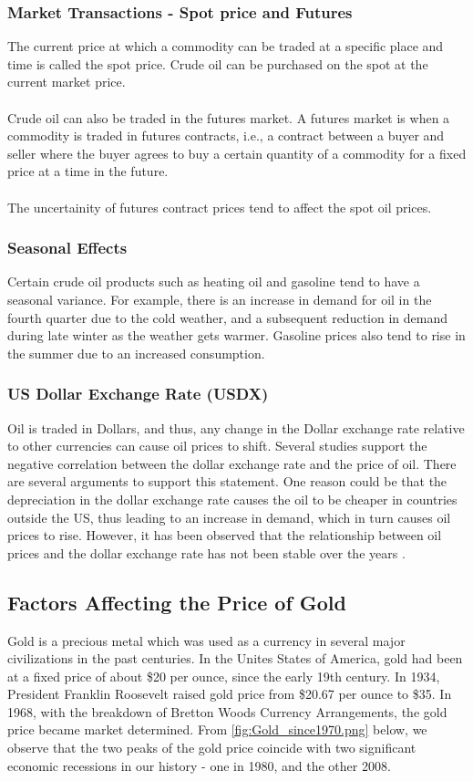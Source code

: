 \documentclass[runningheads]{llncs}
\begin{document}
\subsubsection{Market Transactions - Spot price and Futures}
The current price at which a commodity can be traded at a specific place and time is called the spot price. Crude oil can be purchased on the spot at the current market price. \\\\
Crude oil can also be traded in the futures market. A futures market is when a commodity is traded in futures contracts, i.e., a contract between a buyer and seller where the buyer agrees to buy a certain quantity of a commodity for a fixed price at a time in the future. \\\\
The uncertainity of futures contract prices tend to affect the spot oil prices.

\subsubsection{Seasonal Effects}
Certain crude oil products such as heating oil and gasoline tend to have a seasonal variance. For example, there is an increase in demand for oil in the fourth quarter due to the cold weather, and a subsequent reduction in demand during late winter as the weather gets warmer. Gasoline prices also tend to rise in the summer due to an increased consumption. 

\subsubsection{US Dollar Exchange Rate (USDX)}
Oil is traded in Dollars, and thus, any change in the Dollar exchange rate relative to other currencies can cause oil prices to shift. Several studies support the negative correlation between the  dollar exchange rate and the price of oil. There are several arguments to support this statement. One reason could be that the depreciation in the dollar exchange rate causes the oil to be cheaper in countries outside the US, thus leading to an increase in demand, which in turn causes oil prices to rise. However, it has been observed that the relationship between oil prices and the dollar exchange rate has not been stable over the years \cite{eiafactors} \cite{oildollar}.

\subsection{Factors Affecting the Price of Gold}
Gold is a precious metal which was used as a currency in several major civilizations in the past centuries. In the Unites States of America, gold had been at a fixed price of about \$20 per ounce, since the early 19th century. In 1934, President Franklin Roosevelt raised gold price from \$20.67 per ounce to \$35. In 1968, with the breakdown of Bretton Woods Currency Arrangements, the gold price became market determined. From \autoref{fig:Gold_since1970.png} below, we observe that the two peaks of the gold price coincide with two significant economic recessions in our history - one in 1980, and the other 2008.\\
\end{document}
